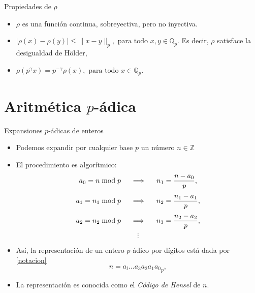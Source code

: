 \documentclass{beamer}
\theoremstyle{definition}
\numberwithin{equation}{section}
\renewcommand{\leq}{\leqslant}
\newcommand{\Z}{\mathbb{Z}}
\newcommand{\pnorm}[1]{\|#1\|_p}
\begin{document}
\begin{frame}{Propiedades de $\rho$}
	\begin{itemize}[<+- | alert@+>]
		\item {$\rho$ es una función continua, sobreyectiva, pero no inyectiva.}
		\item $|\rho (x)-\rho (y)| \leq\pnorm{x-y}, \text{ para todo } x, y \in \mathbb{Q}_{p}$.
		Es decir, $\rho$ satisface la desigualdad de Hölder,
		\item $\rho\left (p^{\gamma} x\right)=p^{-\gamma} \rho (x), \text{ para todo }x \in \mathbb{Q}_{p}.$
	\end{itemize}
\end{frame}
\section{Aritmética $p$-ádica}

\begin{frame}{Expansiones $p$-ádicas de enteros}
	\begin{itemize}[<+- | alert@+>]
		\item Podemos expandir por cualquier base $p$ un número $n\in\Z$
		\item El procedimiento es algorítmico:
		$$a_0 =n\bmod p\hspace{5mm} \Longrightarrow \hspace{5mm} n_1 = \frac{n-a_0}{p},$$ $$a_1 =n_1\bmod p \hspace{5mm} \Longrightarrow \hspace{5mm} n_2 = \frac{n_1-a_1}{p},$$ $$a_2 =n_2\bmod p \hspace{5mm} \Longrightarrow \hspace{5mm} n_3 = \frac{n_2-a_2}{p},$$
		$$\vdots$$
		\item Así, la representación de un entero $p$-ádico por dígitos está dada por \ref{notacion}
		$$n={ a_{l} \ldots a_{3} a_{2} a_{1} a_{0}}_p,$$
		\item La representación es conocida como el \textit{Código de Hensel} de $n$.
	\end{itemize}
\end{frame}
\end{document}
